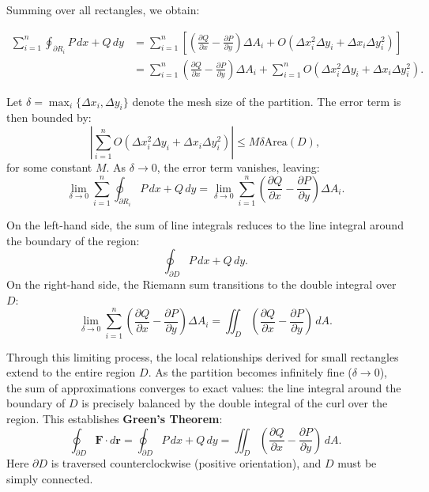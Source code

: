 \noindent Summing over all rectangles, we obtain:

\begin{align*}
\sum_{i=1}^n \oint_{\partial R_i} P\,dx + Q\,dy &= \sum_{i=1}^n \left[\left(\frac{\partial Q}{\partial x} - \frac{\partial P}{\partial y}\right)\Delta A_i + O(\Delta x_i^2\Delta y_i + \Delta x_i\Delta y_i^2)\right] \\[1em]
&= \sum_{i=1}^n \left(\frac{\partial Q}{\partial x} - \frac{\partial P}{\partial y}\right)\Delta A_i + \sum_{i=1}^n O(\Delta x_i^2\Delta y_i + \Delta x_i\Delta y_i^2).
\end{align*}

\noindent Let $\delta = \max_i\{\Delta x_i, \Delta y_i\}$ denote the mesh size of the partition. The error term is then bounded by:
\[
\left|\sum_{i=1}^n O(\Delta x_i^2\Delta y_i + \Delta x_i\Delta y_i^2)\right| \leq M\delta \text{Area}(D),
\]
for some constant $M$. As $\delta \to 0$, the error term vanishes, leaving:
\[
\lim_{\delta \to 0} \sum_{i=1}^n \oint_{\partial R_i} P\,dx + Q\,dy = \lim_{\delta \to 0} \sum_{i=1}^n \left(\frac{\partial Q}{\partial x} - \frac{\partial P}{\partial y}\right)\Delta A_i.
\]

\noindent On the left-hand side, the sum of line integrals reduces to the line integral around the boundary of the region:
\[
\oint_{\partial D} P\,dx + Q\,dy.
\]
On the right-hand side, the Riemann sum transitions to the double integral over $D$:
\[
\lim_{\delta \to 0} \sum_{i=1}^n \left(\frac{\partial Q}{\partial x} - \frac{\partial P}{\partial y}\right)\Delta A_i = \iint_D \left(\frac{\partial Q}{\partial x} - \frac{\partial P}{\partial y}\right)\,dA.
\]

\bigskip

\noindent Through this limiting process, the local relationships derived for small rectangles extend to the entire region $D$. As the partition becomes infinitely fine ($\delta \to 0$), the sum of approximations converges to exact values: the line integral around the boundary of $D$ is precisely balanced by the double integral of the curl over the region. This establishes \textbf{Green's Theorem}:
\[
\oint_{\partial D} \mathbf{F} \cdot d\mathbf{r} = \oint_{\partial D} P\,dx + Q\,dy = \iint_D \left(\frac{\partial Q}{\partial x} - \frac{\partial P}{\partial y}\right)\,dA.
\]
\noindent Here \( \partial D \) is traversed counterclockwise (positive orientation), and \( D \) must be simply connected.\\ \\

